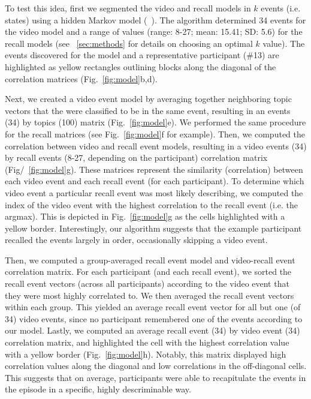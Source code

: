 \documentclass{article}
\begin{document}
{To test this idea, first we segmented the video and recall models in $k$ events (i.e. states) using a hidden Markov model (~\citep{BaldEtal17}). The algorithm determined 34 events for the video model and a range of values (range: 8-27; mean: 15.41; SD: 5.6) for the recall models (see ~\ref{sec:methods} for details on choosing an optimal $k$ value).  The events discovered for the model and a representative participant (\#13) are highlighted as yellow rectangles outlining blocks along the diagonal of the correlation matrices (Fig.~\ref{fig:model}b,d).

Next, we created a video event model by averaging together neighboring topic vectors that the were classified to be in the same event, resulting in an events (34) by topics (100) matrix (Fig.~\ref{fig:model}e).  We performed the same procedure for the recall matrices (see Fig.~\ref{fig:model}f for example). Then, we computed the correlation between video and recall event models, resulting in a video events (34) by recall events (8-27, depending on the participant) correlation matrix (Fig/~\ref{fig:model}g). These matrices represent the similarity (correlation) between each video event and each recall event (for each participant). To determine which video event a particular recall event was most likely describing, we computed the index of the video event with the highest correlation to the recall event (i.e. the argmax).  This is depicted in Fig.~\ref{fig:model}g as the cells highlighted with a yellow border. Interestingly, our algorithm suggests that the example participant recalled the events largely in order, occasionally skipping a video event.

Then, we computed a group-averaged recall event model and video-recall event correlation matrix. For each participant (and each recall event), we sorted the recall event vectors (across all participants) according to the video event that they were most highly correlated to. We then averaged the recall event vectors within each group. This yielded an average recall event vector for all but one (of 34) video events, since no participant remembered one of the events according to our model. Lastly, we computed an average recall event (34) by video event (34) correlation matrix, and highlighted the cell with the highest correlation value with a yellow border (Fig.~\ref{fig:model}h). Notably, this matrix displayed high correlation values along the diagonal and low correlations in the off-diagonal cells. This suggests that on average, participants were able to recapitulate the events in the episode in a specific, highly descriminable way.

}
\end{document}
